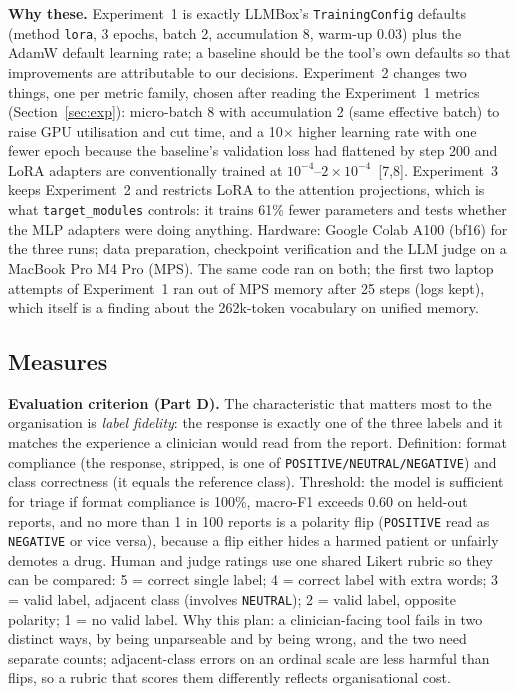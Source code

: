 \documentclass[11pt]{article}
\newcommand{\code}[1]{\texttt{#1}}
\begin{document}
\textbf{Why these.} Experiment~1 is exactly LLMBox's \code{TrainingConfig} defaults (method \code{lora}, 3 epochs, batch 2, accumulation 8, warm-up 0.03) plus the AdamW default learning rate; a baseline should be the tool's own defaults so that improvements are attributable to our decisions. Experiment~2 changes two things, one per metric family, chosen after reading the Experiment~1 metrics (Section~\ref{sec:exp}): micro-batch 8 with accumulation 2 (same effective batch) to raise GPU utilisation and cut time, and a 10$\times$ higher learning rate with one fewer epoch because the baseline's validation loss had flattened by step 200 and LoRA adapters are conventionally trained at $10^{-4}$--$2\times10^{-4}$~[7,8]. Experiment~3 keeps Experiment~2 and restricts LoRA to the attention projections, which is what \code{target\_modules} controls: it trains 61\% fewer parameters and tests whether the MLP adapters were doing anything. Hardware: Google Colab A100 (bf16) for the three runs; data preparation, checkpoint verification and the LLM judge on a MacBook Pro M4 Pro (MPS). The same code ran on both; the first two laptop attempts of Experiment~1 ran out of MPS memory after 25 steps (logs kept), which itself is a finding about the 262k-token vocabulary on unified memory.

\subsection{Measures}
\textbf{Evaluation criterion (Part D).} The characteristic that matters most to the organisation is \emph{label fidelity}: the response is exactly one of the three labels and it matches the experience a clinician would read from the report. Definition: format compliance (the response, stripped, is one of \code{POSITIVE/NEUTRAL/NEGATIVE}) and class correctness (it equals the reference class). Threshold: the model is sufficient for triage if format compliance is 100\%, macro-F1 exceeds 0.60 on held-out reports, and no more than 1 in 100 reports is a polarity flip (\code{POSITIVE} read as \code{NEGATIVE} or vice versa), because a flip either hides a harmed patient or unfairly demotes a drug. Human and judge ratings use one shared Likert rubric so they can be compared: 5 = correct single label; 4 = correct label with extra words; 3 = valid label, adjacent class (involves \code{NEUTRAL}); 2 = valid label, opposite polarity; 1 = no valid label. Why this plan: a clinician-facing tool fails in two distinct ways, by being unparseable and by being wrong, and the two need separate counts; adjacent-class errors on an ordinal scale are less harmful than flips, so a rubric that scores them differently reflects organisational cost.
\end{document}
